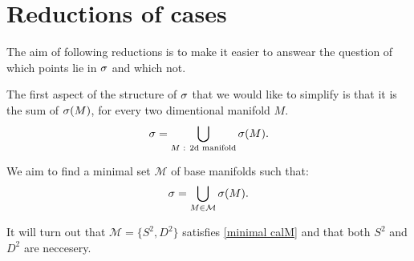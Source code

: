 


\section{Reductions of cases}
The aim of following reductions is to make it easier to answear the question of which 
points lie in ${\sigma}$ and which not. 

The first aspect of the structure of ${\sigma}$ that we would like to simplify is that it is 
the sum of ${{\sigma}(M)}$, for 
every two dimentional manifold $M$. 
\begin{equation}
{\sigma} = \bigcup_{M\textrm{ : 2d manifold}} {{\sigma}(M)}.
\end{equation}


We aim to find a minimal set $\mathcal{M}$ of base manifolds 
such that:
\begin{equation}\label{minimal calM}
{\sigma} = \bigcup_{M\in\mathcal{M}}{{\sigma}(M)}.
\end{equation}

It will turn out that $\mathcal{M} = \{S^2, D^2\}$ satisfies \ref{minimal calM} and 
that both $S^2$ and $D^2$ are neccesery. 


